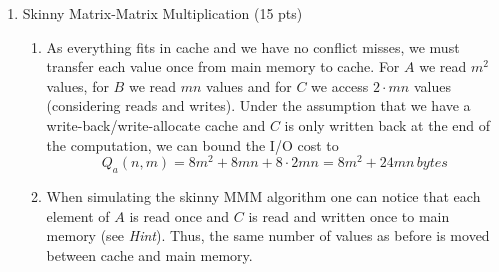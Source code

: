 \documentclass[a4paper]{article}
\begin{document}
\begin{enumerate}
\begin{enumerate}
\begin{center}
                \end{center}
        \end{enumerate}
    \item Skinny Matrix-Matrix Multiplication (15 pts)
    \begin{enumerate}
        \item As everything fits in cache and we have no conflict misses, we
            must transfer each value once from main memory to cache. For $A$ we
            read $m^2$ values, for $B$ we read $mn$ values and for $C$
            we access $2 \cdot mn$ values (considering reads and
            writes). Under the assumption that we have
            a write-back/write-allocate cache and $C$ is only written back at
            the end of the computation, we can bound the I/O cost to
            \begin{equation*}
                Q_a(n,m) = 8m^2 + 8mn + 8 \cdot 2mn = 8m^2 + 24mn \, bytes
            \end{equation*}

        \item When simulating the skinny MMM algorithm one can notice that each
            element of $A$ is read once and $C$ is read and written once to main
            memory (see \textit{Hint}). Thus, the same number of values as
            before is moved between cache and main memory.


\end{enumerate}
\end{enumerate}
\end{document}
